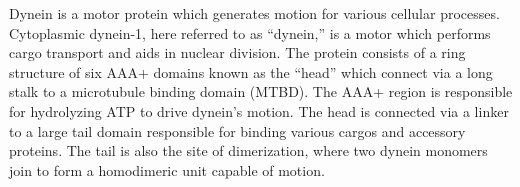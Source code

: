 \documentclass[9pt,twocolumn,twoside]{article}
\begin{document}




Dynein is a motor protein which generates motion for various cellular processes. Cytoplasmic dynein-1, here referred to as ``dynein,'' is a motor which performs cargo transport and aids in nuclear division. The protein consists of a ring structure of six AAA+ domains known as the ``head'' which connect via a long stalk to a microtubule binding domain (MTBD). The AAA+ region is responsible for hydrolyzing ATP to drive dynein's motion. The head is connected via a linker to a large tail domain responsible for binding various cargos and accessory proteins. The tail is also the site of dimerization, where two dynein monomers join to form a homodimeric unit capable of motion.
\end{document}

